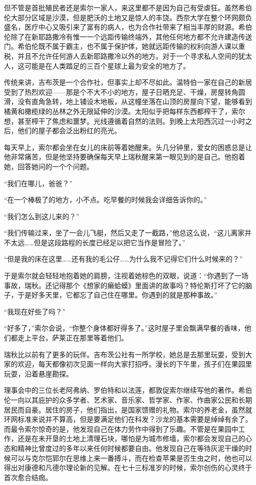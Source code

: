 \documentclass[AutoFakeBold=true]{book}
\begin{document}
但不管是首批殖民者还是索尔一家人，来这里都不是因为自己有受虐狂。虽然希伯伦大部分区域是沙漠，但是肥沃的土地又是惊人的丰饶。西奈大学在整个环网颇负盛名，医疗中心又吸引来了富有的病人，也为合作社带来了相当丰厚的财源。希伯伦除了在新耶路撒冷有惟一一个远距传输终端外，其他任何地方都不允许建造传送门。希伯伦既不属于霸主，也不属于保护体，她就远距传输的权利向游人课以重税，并且不允许任何游人去新耶路撒冷以外的地方。对于一个寻求私人空间的犹太人，这可能是在人类踏足的三百个星球上最为安全的地方了。

传统来讲，吉布茨是一个合作社，但事实上却不尽如此。温特伯一家在自己的新居受到了热烈欢迎——那是个不大不小的地方，屋子日晒充足、干燥，房屋转角圆滑，没有直角急转，地上铺设木地板，从这幢坐落在山顶的房屋向下望，能够看到橘黄和橄榄绿的丛林之外无限延伸的沙漠。太阳似乎把每样东西都榨干了，索尔想，甚至榨干了焦虑和噩梦。光线遵循着自然的法则。到晚上太阳西沉过一小时之后，他们的屋子都会泛出粉红的亮光。

\vspace*{1em}

每天早上，索尔都会坐在女儿的床前等着她醒来。头几分钟里，爱女的困惑总是让他非常痛苦，但是他坚持要确保每天早上瑞秋醒来第一眼见到的是自己。他抱着她，回答她问的一个个问题。

``我们在哪儿，爸爸？''

``在一个棒极了的地方，小不点。吃早餐的时候我会详细告诉你的。''

``我们怎么到这儿来的？''

``我们传输过来，坐了一会儿飞艇，然后又走了一截路，''他总这么说，``这儿离家并不太远……但是这段路程的长度已经足以把它当作是冒险了。''

``但是我的床在这里……还有我的毛公仔……为什么我不记得它们什么时候来的？''

于是索尔就会轻轻地抱着她的肩膀，注视着她棕色的双眼，说道：``你遇到了一场事故，瑞秋。还记得那个《想家的癞蛤蟆》里面讲的故事吗？特伦斯打坏了它的脑子，于是好多天里，它都忘了自己住在哪里。你遇到的就是那种事故。''

``我现在好些了吗？''

``好多了，''索尔会说，``你整个身体都好得多了。''这时屋子里会飘满早餐的香味，他们都走上平台，萨莱正在那里等着他们。

\vspace*{1em}

瑞秋比以前有了更多的玩伴。吉布茨公社有一所学校，她总是去那里玩耍，受到大家的欢迎，每天都像初次见面一样向大家打招呼。漫长的下午里，孩子们在果园里玩耍，沿着悬崖勘探。

理事会中的三位长老阿弗纳、罗伯特和以法莲，都敦促索尔继续写他的著作。希伯伦一向以其庇护的众多学者、艺术家、音乐家、哲学家、作家、作曲家公民和长期居民而自豪。居住的房子，他们指出，是国家馈赠的礼物。索尔的养老金，虽然就环网标准来说并不算高，但是要满足他们在科发？沙龙的基本需要是绰绰有余了。而最令索尔惊奇的是，他发现自己在体力劳作中得到了乐趣。不管是在果园中工作，还是在未开垦的土地上清理石块，哪怕是为城市修墙，索尔都会发现自己的心态和精神比曾度过的多年以来任何时候都要自由。他发现自己在等待灰泥干燥的时候可以与克尔恺郭尔在思维上来一番搏斗，而在检查苹果是否生虫之时，他也可以得出对康德和凡德尔理论新的见解。在七十三标准岁的时候，索尔创伤的心灵终于首次愈合结痂。
\end{document}
